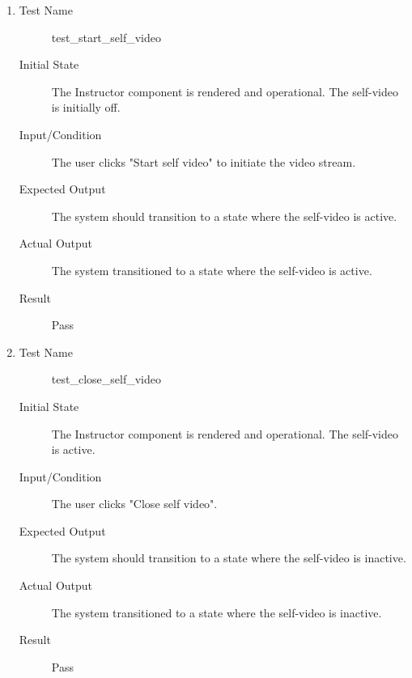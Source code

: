 \documentclass[12pt, titlepage]{article}
\begin{document}
\begin{enumerate}[UT-M1]
\item \label{UT-M4}
  \begin{description}
  \item[Test Name] test\_start\_self\_video
  \item[Initial State] The Instructor component is rendered and operational. The
    self-video is initially off.
  \item[Input/Condition] The user clicks "Start self video" to initiate the
    video stream.
  \item[Expected Output] The system should transition to a state where the
    self-video is active.
  \item[Actual Output] The system transitioned to a state where the self-video
    is active.
  \item[Result] Pass
  \end{description}
\item \label{UT-M5}
  \begin{description}
  \item[Test Name] test\_close\_self\_video
  \item[Initial State] The Instructor component is rendered and operational. The
    self-video is active.
  \item[Input/Condition] The user clicks "Close self video".
  \item[Expected Output] The system should transition to a state where the
    self-video is inactive.
  \item[Actual Output] The system transitioned to a state where the self-video
    is inactive.
  \item[Result] Pass
  \end{description}
\end{enumerate}
\end{document}
